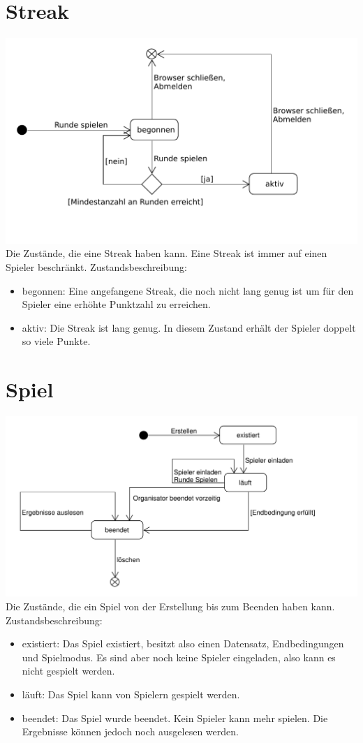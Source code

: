 \documentclass[a4paper]{scrreprt}
\begin{document}
	\section{Streak}
	\hypertarget{StreakState}{}
	\label{fig:Streak_State}
	\includegraphics[width=\textwidth]{img/Streak_Zustand.pdf}
	Die Zustände, die eine Streak haben kann.
	Eine Streak ist immer auf einen Spieler beschränkt.
	Zustandsbeschreibung:
	\begin{itemize}
		\item begonnen: Eine angefangene Streak, die noch nicht lang genug ist um für den Spieler eine erhöhte Punktzahl zu erreichen.
		\item aktiv: Die Streak ist lang genug. In diesem Zustand erhält der Spieler doppelt so viele Punkte.
	\end{itemize}
	\section{Spiel}
	\label{fig:Spiel_State}
	\includegraphics[width=\textwidth]{img/Spiel_Zustand.pdf}
	Die Zustände, die ein Spiel von der Erstellung bis zum Beenden haben kann.
	Zustandsbeschreibung:
	\begin{itemize}
		\item existiert: Das Spiel existiert, besitzt also einen Datensatz, Endbedingungen und Spielmodus. Es sind aber noch keine Spieler eingeladen, also kann es nicht gespielt werden.
		\item läuft: Das Spiel kann von Spielern gespielt werden.
		\item beendet: Das Spiel wurde beendet. Kein Spieler kann mehr spielen. Die Ergebnisse können jedoch noch ausgelesen werden.
	\end{itemize}
\end{document}
